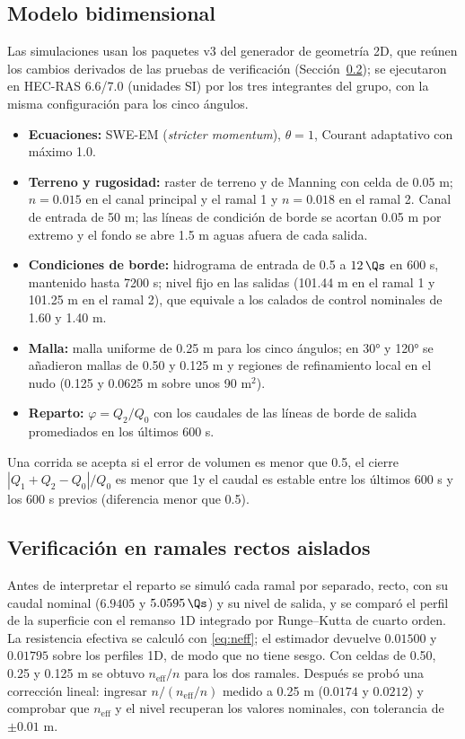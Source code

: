 \subsection{Modelo bidimensional}\label{sec:hecras}
Las simulaciones usan los paquetes v3 del generador de geometría 2D, que reúnen los cambios derivados de las pruebas de verificación (Sección~\ref{sec:verif2d}); se ejecutaron en HEC-RAS 6.6/7.0 (unidades SI) por los tres integrantes del grupo, con la misma configuración para los cinco ángulos.
\begin{itemize}
\item \textbf{Ecuaciones:} SWE-EM (\emph{stricter momentum}), $\theta=1$, Courant adaptativo con máximo 1.0.
\item \textbf{Terreno y rugosidad:} raster de terreno y de Manning con celda de 0.05 m; $n=0.015$ en el canal principal y el ramal 1 y $n=0.018$ en el ramal 2. Canal de entrada de 50 m; las líneas de condición de borde se acortan 0.05 m por extremo y el fondo se abre 1.5 m aguas afuera de cada salida.
\item \textbf{Condiciones de borde:} hidrograma de entrada de 0.5 a $12\,\Qs$ en 600 s, mantenido hasta 7200 s; nivel fijo en las salidas (101.44 m en el ramal 1 y 101.25 m en el ramal 2), que equivale a los calados de control nominales de 1.60 y 1.40 m.
\item \textbf{Malla:} malla uniforme de 0.25 m para los cinco ángulos; en 30° y 120° se añadieron mallas de 0.50 y 0.125 m y regiones de refinamiento local en el nudo (0.125 y 0.0625 m sobre unos 90 m$^2$).
\item \textbf{Reparto:} $\varphi=Q_2/Q_0$ con los caudales de las líneas de borde de salida promediados en los últimos 600 s.
\end{itemize}
Una corrida se acepta si el error de volumen es menor que 0.5\pc, el cierre $|Q_1+Q_2-Q_0|/Q_0$ es menor que 1\pc y el caudal es estable entre los últimos 600 s y los 600 s previos (diferencia menor que 0.5\pc).

\subsection{Verificación en ramales rectos aislados}\label{sec:verif2d}
Antes de interpretar el reparto se simuló cada ramal por separado, recto, con su caudal nominal ($6.9405$ y $5.0595\,\Qs$) y su nivel de salida, y se comparó el perfil de la superficie con el remanso 1D integrado por Runge--Kutta de cuarto orden. La resistencia efectiva se calculó con \eqref{eq:neff}; el estimador devuelve $0.01500$ y $0.01795$ sobre los perfiles 1D, de modo que no tiene sesgo. Con celdas de 0.50, 0.25 y 0.125 m se obtuvo $n_\mathrm{eff}/n$ para los dos ramales. Después se probó una corrección lineal: ingresar $n/(n_\mathrm{eff}/n)$ medido a 0.25 m ($0.0174$ y $0.0212$) y comprobar que $n_\mathrm{eff}$ y el nivel recuperan los valores nominales, con tolerancia de $\pm0.01$ m.

